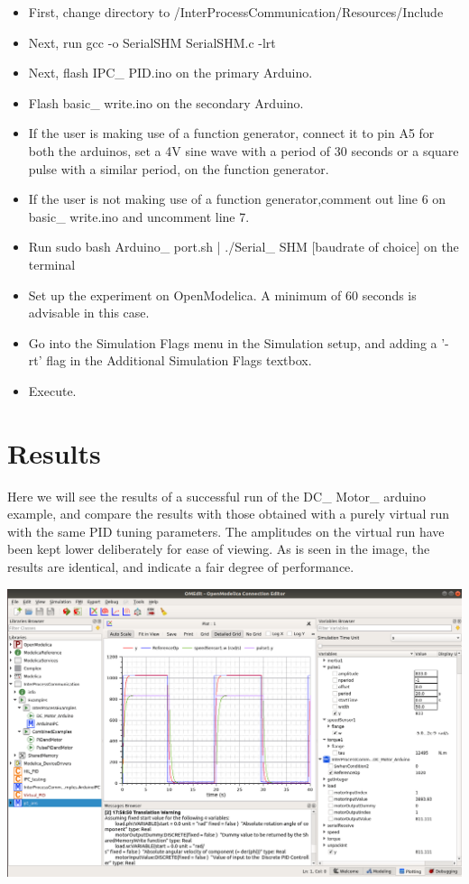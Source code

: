 \documentclass{hitec}
\begin{document}
\begin{itemize}
  \item First, change directory to /InterProcessCommunication/Resources/Include
  \item Next, run gcc -o Serial\textunderscore SHM Serial\textunderscore SHM.c -lrt 
  \item Next, flash IPC\_ PID.ino on the primary Arduino.
  \item Flash basic\_ write.ino on the secondary Arduino.
  \item If the user is making use of a function generator, connect it to pin A5 for both the arduinos, set a 4V sine wave with a period of 30 seconds or a square pulse with a similar period, on the function generator.
  \item If the user is not making use of a function generator,comment out line 6 on basic\_ write.ino and uncomment line 7.
  \item Run sudo bash Arduino\_ port.sh | ./Serial\_ SHM [baudrate of choice] on the terminal
  \item Set up the experiment on OpenModelica. A minimum of 60 seconds is advisable in this case. \
  \item Go into the Simulation Flags menu in the Simulation setup, and adding a '-rt' flag in the Additional Simulation Flags textbox.
  \item Execute.
  \end{itemize}
  
\section{Results}
Here we will see the results of a successful run of the DC\_ Motor\_ arduino example, and compare the results with those obtained with a purely virtual run with the same PID tuning parameters. The amplitudes on the virtual run have been kept lower deliberately for ease of viewing. As is seen in the image, the results are identical, and indicate a fair degree of performance.

\includegraphics[scale=0.25]{Modelica_Output.png}
\end{document}
